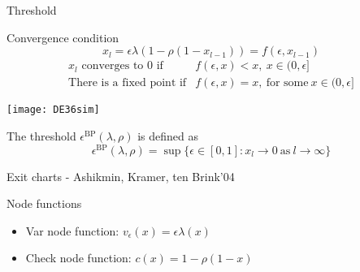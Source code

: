 \begin{frame}{Threshold}
%
\vspace{-2mm}
\begin{block}{Convergence condition}
\[ x_l  = \epsilon \lambda(1-\rho(1-x_{l-1})) = f(\epsilon,x_{l-1}) \]
\[
\begin{array}{rl}
\text{$x_l$ converges to 0 if} & f(\epsilon,x) < x, \ x \in (0,\epsilon] \\
\text{There is a fixed point if} & f(\epsilon,x) = x, \ \text{for some} \ x \in (0,\epsilon]
\end{array}
\]
\end{block}
\pause
\begin{center}
  \texttt{[image: DE36sim]}
\end{center}
\pause
\vspace*{-3mm}
\begin{block}{The threshold $\epsilon^{\text{BP}}(\lambda,\rho)$ is defined as}
\[
\epsilon^{\text{BP}}(\lambda,\rho) = \sup \{\epsilon \in [0,1]: x_l \rightarrow 0 \ \text{as} \ l \rightarrow \infty \}
\]
\end{block}

\end{frame}
\begin{frame}{Exit charts - Ashikmin, Kramer, ten Brink'04}
\begin{block}{Node functions}
\begin{itemize}
\item Var node function: $v_{\epsilon}(x) = \epsilon \lambda(x)$
\item Check node function: $c(x) = 1- \rho(1-x)$
\end{itemize}
\end{block}
\begin{columns}
\begin{column}{0.47\textwidth}
\begin{center}
\scalebox{0.35}{}
\end{center}
\end{column}

\begin{column}{0.47\textwidth}
\begin{center}
\scalebox{0.35}{}
\end{center}

\end{column}

\end{columns}
\end{frame}
